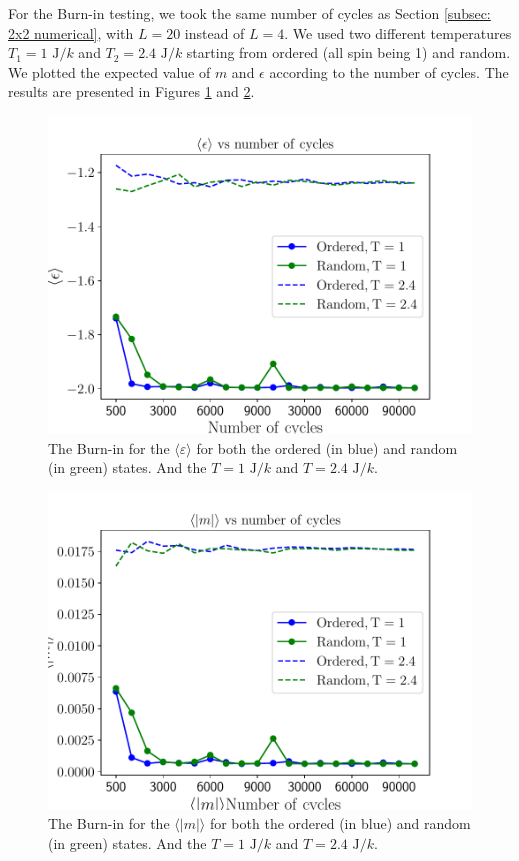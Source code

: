\documentclass[english,notitlepage,reprint,nofootinbib]{revtex4-2}  %
\begin{document}
	For the Burn-in testing, we took the same number of cycles as Section \ref{subsec: 2x2 numerical},
	with $L=20$ instead of $L=4$. We used two different temperatures $T_1=1 \text{ J}/k$ and $T_2=2.4 \text{ J}/k$
	starting from ordered (all spin being 1) and random. We plotted the expected value of $m$ and $\epsilon$ according to the number of cycles. The results are presented in
	Figures \ref{fig:eps5} and \ref{fig:m5}.

	\begin{figure}[h!]
		\centering
		\includegraphics[scale=0.55]{figures/epsilon_problem5.pdf}
		\caption{The Burn-in for the $\langle \varepsilon \rangle$ for both the ordered (in blue) and random (in green) states. And the $T=1 \text{ J}/k$ and $T=2.4 \text{ J}/k$.}
		\label{fig:eps5}
	\end{figure}
	\begin{figure}[h!]
		\centering
		\includegraphics[scale=0.55]{figures/m_problem5.pdf}
		\caption{The Burn-in for the $\langle |m| \rangle$ for both the ordered (in blue) and random (in green) states. And the $T=1 \text{ J}/k$ and $T=2.4 \text{ J}/k$.}
		\label{fig:m5}
	\end{figure}
\end{document}
